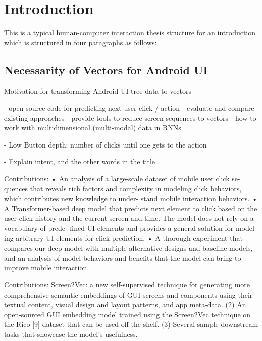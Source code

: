 \chapter{Introduction}
\label{sec:introduction}

This is a typical human-computer interaction thesis structure for an introduction which is structured in four paragraphs as follows:

\section{Necessarity of Vectors for Android UI}

Motivation for transforming Android UI tree data to vectors

- open source code for predicting next user click / action
- evaluate and compare existing approaches
- provide tools to reduce screen sequences to vectors
- how to work with multidimensional (multi-modal) data in RNNs

- Low Button depth: number of clicks until one gets to the action \cite{lee2018click}

- Explain intent, and the other words in the title

Contributions: \cite{zhou2021large}
• An analysis of a large-scale dataset of mobile user click se-
quences that reveals rich factors and complexity in modeling
click behaviors, which contributes new knowledge to under-
stand mobile interaction behaviors.
• A Transformer-based deep model that predicts next element
to click based on the user click history and the current screen
and time. The model does not rely on a vocabulary of prede-
fined UI elements and provides a general solution for model-
ing arbitrary UI elements for click prediction.
• A thorough experiment that compares our deep model with
multiple alternative designs and baseline models, and an
analysis of model behaviors and benefits that the model can
bring to improve mobile interaction.

Contributions: \cite{screen2vec}
Screen2Vec: a new self-supervised technique for generating
more comprehensive semantic embeddings of GUI screens
and components using their textual content, visual design
and layout patterns, and app meta-data.
(2) An open-sourced GUI embedding model trained using the
Screen2Vec technique on the Rico [9] dataset that can be
used off-the-shelf.
(3) Several sample downstream tasks that showcase the model’s
usefulness.

